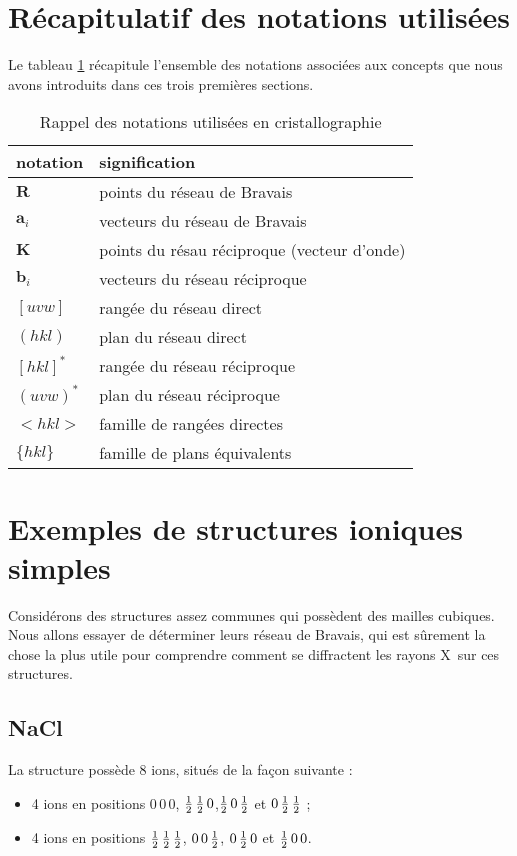 \section{Récapitulatif des notations utilisées}

Le tableau \ref{tab:rappel} récapitule l'ensemble des notations associées aux concepts que nous avons introduits dans ces trois premières sections.

\begin{table}[ht]
\begin{tabularx}{\textwidth}{Xl}
\toprule
notation & signification \\
\midrule
$\mathbf{R}$ & points du réseau de Bravais \\
$\mathbf{a}_i$ & vecteurs du réseau de Bravais \\
$\mathbf{K}$ & points du résau réciproque (vecteur d'onde) \\
$\mathbf{b}_i$ & vecteurs du réseau réciproque \\
$[u v w]$ & rangée du réseau direct\\
$(hkl)$ & plan du réseau direct \\
$[hkl]^*$ & rangée du réseau réciproque \\
$(uvw)^*$ & plan du réseau réciproque \\
$<hkl>$ & famille de rangées directes \\
$\{hkl\}$ & famille de plans équivalents\\
\bottomrule
\end{tabularx}
\caption[Notations utilisées en cristallographie]{Rappel des notations utilisées en cristallographie}
\label{tab:rappel}
\end{table}


\section{Exemples de structures ioniques simples}

Considérons des structures assez communes qui possèdent des mailles cubiques. Nous allons essayer de déterminer leurs réseau de Bravais, qui est sûrement la chose la plus utile pour comprendre comment se diffractent les rayons X sur ces structures.

\subsection{NaCl}
La structure  possède 8 ions, situés de la façon suivante :
\begin{itemize}
    \item 4 ions  en positions $0\,0\,0$, $\mbox{$\frac{1}{2}$}\,\mbox{$\frac{1}{2}$}\,0$,$\mbox{$\frac{1}{2}$}\,0\,\mbox{$\frac{1}{2}$}$ et $0\,\mbox{$\frac{1}{2}$}\,\mbox{$\frac{1}{2}$}$ ;
    \item 4 ions  en positions $\mbox{$\frac{1}{2}$}\,\mbox{$\frac{1}{2}$}\,\mbox{$\frac{1}{2}$}$, $0\,0\,\mbox{$\frac{1}{2}$}$, $0\,\mbox{$\frac{1}{2}$}\,0$ et $\mbox{$\frac{1}{2}$}\,0\,0$.
\end{itemize}

